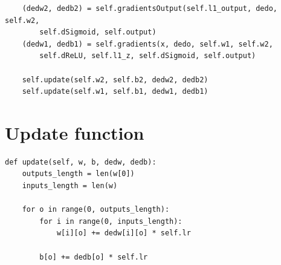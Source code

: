 \begin{appendices}
\begin{verbatim}
    (dedw2, dedb2) = self.gradientsOutput(self.l1_output, dedo, self.w2, 
        self.dSigmoid, self.output)
    (dedw1, dedb1) = self.gradients(x, dedo, self.w1, self.w2, 
        self.dReLU, self.l1_z, self.dSigmoid, self.output)
    
    self.update(self.w2, self.b2, dedw2, dedb2)
    self.update(self.w1, self.b1, dedw1, dedb1)
\end{verbatim}

\section{Update function}
\begin{verbatim}
def update(self, w, b, dedw, dedb):
    outputs_length = len(w[0])
    inputs_length = len(w)
    
    for o in range(0, outputs_length):
        for i in range(0, inputs_length):
            w[i][o] += dedw[i][o] * self.lr
        
        b[o] += dedb[o] * self.lr
\end{verbatim}

\end{appendices}
